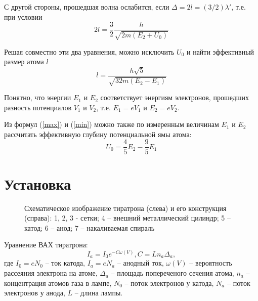\documentclass[12pt,a4paper]{article}
\begin{document}
С другой стороны, прошедшая волна ослабится, если $\Delta = 2l = (3/2)\lambda'$, т.е. при условии 
\begin{equation} \label{min}
2l = \frac{3}{2} \frac{h}{\sqrt{2m(E_2 + U_0)}}
\end{equation}

Решая совместно эти два уравнения, можно исключить $U_0$ и найти эффективный размер атома $l$
\begin{equation} \label{size}
l = \frac{h \sqrt{5}}{\sqrt{32m(E_2 - E_1)}}
\end{equation}

Понятно, что энергии $E_1$ и $E_2$ соответствует энергиям электронов, прошедших разность потенциалов $V_1$ и $V_2$, т.е. $E_1 = eV_1$ и $E_2 = eV_2$. 

Из формул (\ref{max}) и (\ref{min}) можно также по измеренным величинам $E_1$ и $E_2$ рассчитать эффективную глубину потенциальной ямы атома:
\begin{equation} \label{hole}
U_0 = \frac{4}{5} E_2 - \frac{9}{5} E_1
\end{equation}

\newpage

\section{Установка}

\begin{figure}[ht!]\label{tiratron} 
\caption{Схематическое изображение тиратрона (слева) и его конструкция (справа): 1, 2, 3 - сетки; 4 -- внешний металлический цилиндр; 5 -- катод; 6 -- анод; 7 -- накаливаемая спираль}
\end{figure}

Уравнение ВАХ тиратрона:
\begin{equation} \label{VAH}
I_a = I_0 e^{-C\omega(V)}, C = L n_a \Delta_a,
\end{equation}
где $I_0 = e N_0$ -- ток катода, $I_a = e N_a$ -- анодный ток, $\omega(V)$ -- вероятность рассеяния электрона на атоме, $\Delta_a$ -- площадь попереченого сечения атома, $n_a$ -- концентрация атомов газа в лампе, $N_0$ -- поток электронов у катода, $N_a$ -- поток электронов у анода, $L$ -- длина лампы.
\end{document}
